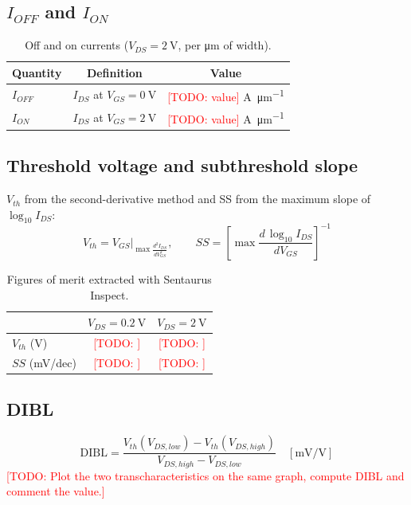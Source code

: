 \documentclass[a4paper,11pt]{article}
\newcommand{\todo}[1]{\textcolor{red}{[TODO: #1]}}
\begin{document}
\subsection{$I_{OFF}$ and $I_{ON}$}
\begin{table}[H]
  \centering
  \caption{Off and on currents ($V_{DS} = \SI{2}{\volt}$, per \si{\micro\meter} of width).}
  \label{tab:ion_ioff}
  \begin{tabular}{lcc}
    \toprule
    Quantity & Definition & Value \\
    \midrule
    $I_{OFF}$ & $I_{DS}$ at $V_{GS} = \SI{0}{\volt}$ & \todo{value} \si{\ampere\per\micro\meter} \\
    $I_{ON}$  & $I_{DS}$ at $V_{GS} = \SI{2}{\volt}$ & \todo{value} \si{\ampere\per\micro\meter} \\
    \bottomrule
  \end{tabular}
\end{table}

\subsection{Threshold voltage and subthreshold slope}
$V_{th}$ from the second-derivative method and SS from the maximum slope of
$\log_{10} I_{DS}$:
\begin{equation}
  V_{th} = V_{GS}\Big|_{\max \frac{d^2 I_{DS}}{dV_{GS}^2}}, \qquad
  SS = \left[\max \frac{d\,\log_{10} I_{DS}}{dV_{GS}}\right]^{-1}
\end{equation}

\begin{table}[H]
  \centering
  \caption{Figures of merit extracted with Sentaurus Inspect.}
  \label{tab:fom}
  \begin{tabular}{lcc}
    \toprule
    & $V_{DS} = \SI{0.2}{\volt}$ & $V_{DS} = \SI{2}{\volt}$ \\
    \midrule
    $V_{th}$ (\si{\volt})        & \todo{} & \todo{} \\
    $SS$ (\si{\milli\volt/dec})  & \todo{} & \todo{} \\
    \bottomrule
  \end{tabular}
\end{table}

\subsection{DIBL}
\begin{equation}
  \mathrm{DIBL} = \frac{V_{th}(V_{DS,low}) - V_{th}(V_{DS,high})}{V_{DS,high} - V_{DS,low}}
  \quad [\si{\milli\volt/\volt}]
\end{equation}
\todo{Plot the two transcharacteristics on the same graph, compute DIBL and comment the value.}
\end{document}
